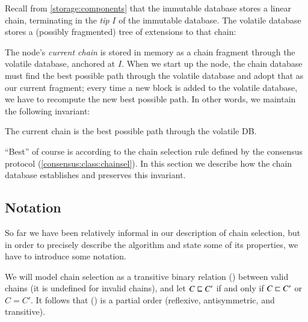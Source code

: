 Recall from \cref{storage:components} that the immutable database stores a
linear chain, terminating in the \emph{tip} $I$ of the immutable database. The
volatile database stores a (possibly fragmented) tree of extensions to that
chain:
%
\begin{center}
\end{center}
%
The node's \emph{current chain} is stored in memory as a chain fragment through
the volatile database, anchored at $I$.  When we start up the node, the chain
database must find the best possible path through the volatile database and
adopt that as our current fragment; every time a new block is added to the
volatile database, we have to recompute the new best possible path. In other
words, we maintain the following invariant:

\begin{definition}
\label{current-chain-invariant}
The current chain is the best possible path through the volatile DB.
\end{definition}

``Best'' of course is according to the chain selection rule defined by the
consensus protocol (\cref{consensus:class:chainsel}). In this section we
describe how the chain database establishes and preserves this invariant.

\subsection{Notation}

So far we have been relatively informal in our description of chain selection,
but in order to precisely describe the algorithm and state some of its
properties, we have to introduce some notation.

\begin{definition}
We will model chain selection as a transitive binary relation (\chainlt) between
valid chains (it is undefined for invalid chains), and let $C \mathrel{\sqsubseteq} C'$ if
and only if $C \mathrel{\sqsubset} C'$ or $C = C'$. It follows that (\chainle) is a partial
order (reflexive, antisymmetric, and transitive).
\end{definition}

